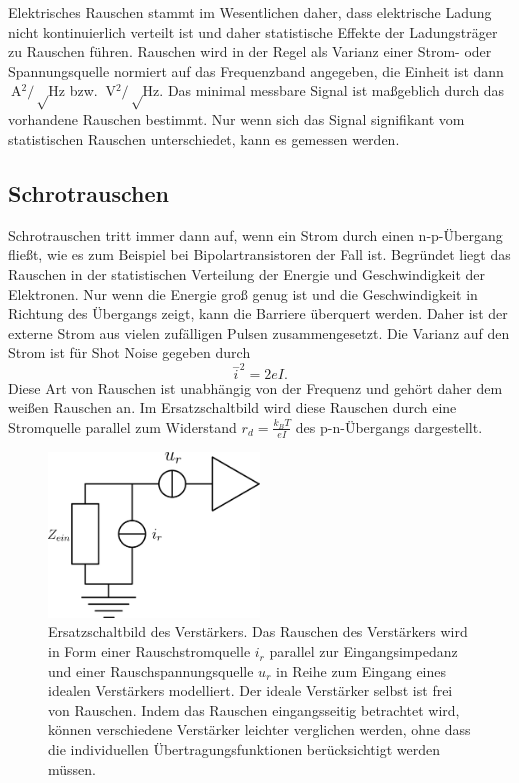 Elektrisches Rauschen stammt im Wesentlichen daher, dass elektrische Ladung nicht kontinuierlich verteilt ist und daher statistische Effekte der Ladungsträger zu Rauschen führen.
Rauschen wird in der Regel als Varianz einer Strom- oder Spannungsquelle normiert auf das Frequenzband angegeben, die Einheit ist dann $\SI{}{\ampere^2\per\sqrt\hertz}$ bzw. $\SI{}{\volt^2\per\sqrt\hertz}$.
Das minimal messbare Signal ist maßgeblich durch das vorhandene Rauschen bestimmt.
Nur wenn sich das Signal signifikant vom statistischen Rauschen unterschiedet, kann es gemessen werden.\cite{Gray}

\subsection*{Schrotrauschen}
Schrotrauschen tritt immer dann auf, wenn ein Strom durch einen n-p-Übergang fließt, wie es zum Beispiel bei Bipolartransistoren der Fall ist.
Begründet liegt das Rauschen in der statistischen Verteilung der Energie und Geschwindigkeit der Elektronen.
Nur wenn die Energie groß genug ist und die Geschwindigkeit in Richtung des Übergangs zeigt, kann die Barriere überquert werden.
Daher ist der externe Strom aus vielen zufälligen Pulsen zusammengesetzt.
Die Varianz auf den Strom ist für Shot Noise gegeben durch
\begin{equation}
\stackrel{-}{i}^2 = 2eI.
\end{equation}
Diese Art von Rauschen ist unabhängig von der Frequenz und gehört daher dem weißen Rauschen an.
Im Ersatzschaltbild wird diese Rauschen durch eine Stromquelle parallel zum Widerstand $r_d = \frac{k_BT}{eI}$ des p-n-Übergangs dargestellt.

\begin{figure}[!t]
\begin{center}
\includegraphics[width=0.50\textwidth]{./fig/NoiseSchematic.pdf}
\vspace{-0.5cm}
\caption{Ersatzschaltbild des Verstärkers.
Das Rauschen des Verstärkers wird in Form einer Rauschstromquelle $i_r$ parallel zur Eingangsimpedanz und einer Rauschspannungsquelle $u_r$ in Reihe zum Eingang eines idealen Verstärkers modelliert.
Der ideale Verstärker selbst ist frei von Rauschen.
Indem das Rauschen eingangsseitig betrachtet wird, können verschiedene Verstärker leichter verglichen werden, ohne dass die individuellen Übertragungsfunktionen berücksichtigt werden müssen.}
\label{fig:NoiseSchematic}
\end{center}
\end{figure}


